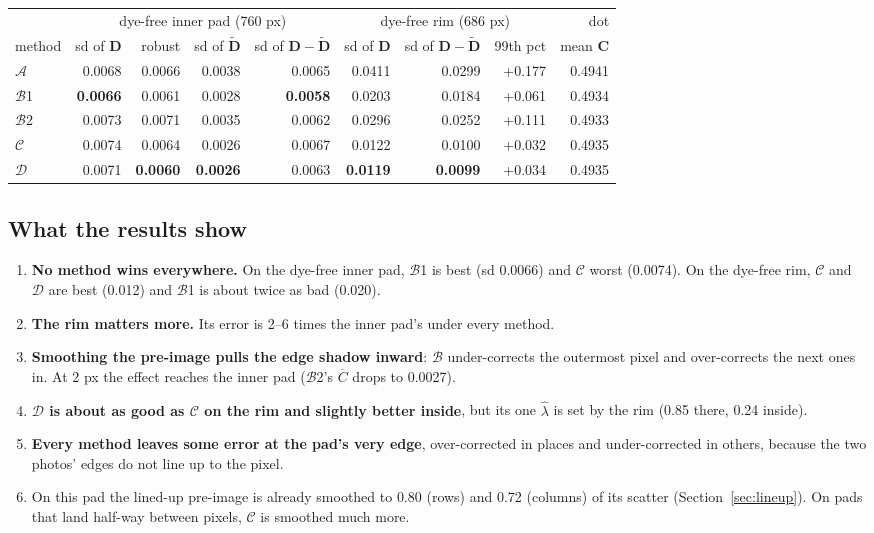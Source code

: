 \documentclass[11pt,letterpaper]{article}
\newcommand{\mC}{\mathbf{C}}   %
\newcommand{\mD}{\mathbf{D}}   %
\newcommand{\tD}{\widetilde{\mathbf{D}}}
\newcommand{\Cbar}{\overline{C}}
\newcommand{\MA}{\mathcal{A}}
\newcommand{\MB}{\mathcal{B}}
\newcommand{\MC}{\mathcal{C}}
\newcommand{\MD}{\mathcal{D}}
\begin{document}
\medskip
\begin{center}
\small
\begin{tabular}{@{}lrrrrrrrr@{}}
\toprule
 & \multicolumn{4}{c}{dye-free inner pad (760 px)} &
   \multicolumn{3}{c}{dye-free rim (686 px)} & dot \\
\cmidrule(lr){2-5}\cmidrule(lr){6-8}\cmidrule(l){9-9}
method & sd of $\mD$ & robust & sd of $\tD$ & sd of $\mD - \tD$ & sd of $\mD$
  & sd of $\mD - \tD$ & 99th pct & mean $\mC$ \\
\midrule
$\MA$  & 0.0068 & 0.0066 & 0.0038 & 0.0065 & 0.0411 & 0.0299 & +0.177 & 0.4941 \\
$\MB$1 & \textbf{0.0066} & 0.0061 & 0.0028 & \textbf{0.0058} & 0.0203 & 0.0184 & +0.061 & 0.4934 \\
$\MB$2 & 0.0073 & 0.0071 & 0.0035 & 0.0062 & 0.0296 & 0.0252 & +0.111 & 0.4933 \\
$\MC$  & 0.0074 & 0.0064 & 0.0026 & 0.0067 & 0.0122 & 0.0100 & +0.032 & 0.4935 \\
$\MD$  & 0.0071 & \textbf{0.0060} & \textbf{0.0026} & 0.0063 & \textbf{0.0119} & \textbf{0.0099} & +0.034 & 0.4935 \\
\bottomrule
\end{tabular}
\end{center}

\subsection{What the results show}

\begin{enumerate}
  \item \textbf{No method wins everywhere.}  On the dye-free inner pad,
    $\MB$1 is best (sd 0.0066) and $\MC$ worst (0.0074).  On the dye-free
    rim, $\MC$ and $\MD$ are best (0.012) and $\MB$1 is about twice as bad
    (0.020).
  \item \textbf{The rim matters more.}  Its error is 2--6 times the inner
    pad's under every method.
  \item \textbf{Smoothing the pre-image pulls the edge shadow inward}: $\MB$
    under-corrects the outermost pixel and over-corrects the next ones in.
    At 2 px the effect reaches the inner pad ($\MB$2's $\Cbar$ drops to
    0.0027).
  \item \textbf{$\MD$ is about as good as $\MC$ on the rim and slightly
    better inside}, but its one $\hat\lambda$ is set by the rim (0.85 there,
    0.24 inside).
  \item \textbf{Every method leaves some error at the pad's very edge},
    over-corrected in places and under-corrected in others, because the
    two photos' edges do not line up to the pixel.
  \item On this pad the lined-up pre-image is already smoothed to 0.80
    (rows) and 0.72 (columns) of its scatter (Section~\ref{sec:lineup}).
    On pads that land half-way between pixels, $\MC$ is smoothed much more.
\end{enumerate}
\end{document}
